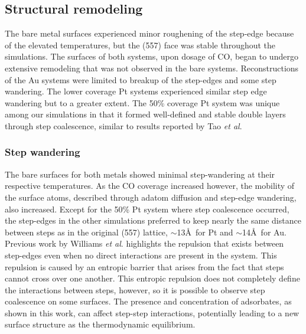 \subsection{Structural remodeling}
The bare metal surfaces experienced minor roughening of the step-edge
because of the elevated temperatures, but the (557) face was stable
throughout the simulations. The surfaces of both systems, upon dosage
of CO, began to undergo extensive remodeling that was not observed in
the bare systems. Reconstructions of the Au systems were limited to
breakup of the step-edges and some step wandering. The lower coverage
Pt systems experienced similar step edge wandering but to a greater
extent. The 50\% coverage Pt system was unique among our simulations
in that it formed well-defined and stable double layers through step
coalescence, similar to results reported by Tao {\it et
  al}.\citep{Tao:2010aa}

\subsubsection{Step wandering}
The bare surfaces for both metals showed minimal step-wandering at
their respective temperatures. As the CO coverage increased however,
the mobility of the surface atoms, described through adatom diffusion
and step-edge wandering, also increased.  Except for the 50\% Pt
system where step coalescence occurred, the step-edges in the other
simulations preferred to keep nearly the same distance between steps
as in the original (557) lattice, $\sim$13\AA~for Pt and
$\sim$14\AA~for Au.  Previous work by Williams {\it et
  al}.\citep{Williams:1991qd, Williams:1994aa} highlights the repulsion
that exists between step-edges even when no direct interactions are
present in the system. This repulsion is caused by an entropic barrier
that arises from the fact that steps cannot cross over one
another. This entropic repulsion does not completely define the
interactions between steps, however, so it is possible to observe step
coalescence on some surfaces.\citep{Williams:1991qd} The presence and
concentration of adsorbates, as shown in this work, can affect
step-step interactions, potentially leading to a new surface structure
as the thermodynamic equilibrium.

